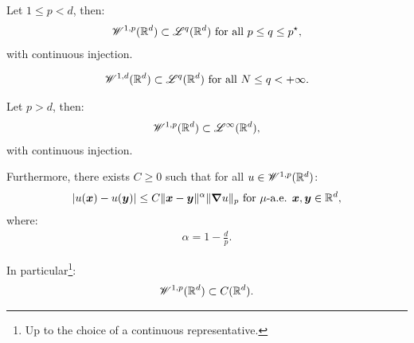 \begin{corollary}
    Let $1 \leq p < d$, then:
    \begin{gather}
        \mathscr{W}^{1, p}(\mathbb{R}^{d}) \subset \mathscr{L}^{q}(\mathbb{R}^{d}) \text{ for all } p \leq q \leq p^{\star},
    \end{gather}
    with continuous injection.
\end{corollary}

\begin{corollary}
    \begin{gather}
        \mathscr{W}^{1, d}(\mathbb{R}^{d}) \subset \mathscr{L}^{q}(\mathbb{R}^{d}) \text{ for all } N \leq q < +\infty.
    \end{gather}
\end{corollary}

\begin{theorem}
    Let $p > d$, then:
    \begin{gather}
        \mathscr{W}^{1, p}(\mathbb{R}^{d}) \subset \mathscr{L}^{\infty}(\mathbb{R}^{d}),
    \end{gather}
    with continuous injection.

    Furthermore, there exists $C \geq 0$ such that for all $u \in \mathscr{W}^{1, p}(\mathbb{R}^{d})$:
    \begin{gather}
        \lvert u(\bm{x}) - u(\bm{y}) \rvert \leq C \lVert \bm{x} - \bm{y} \rVert^{\alpha} \lVert \bm{\nabla} u \rVert_p \text{ for } \mu \text{-a.e. } \bm{x}, \bm{y} \in \mathbb{R}^{d},
    \end{gather}
    where:
    \begin{gather}
        \alpha = 1 - \frac{d}{p}.
    \end{gather}

    In particular\footnote{Up to the choice of a continuous representative.}:
    \begin{gather}
        \mathscr{W}^{1, p}(\mathbb{R}^{d}) \subset C(\mathbb{R}^{d}).
    \end{gather}
\end{theorem}

